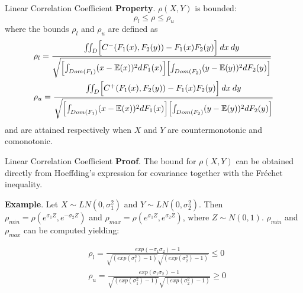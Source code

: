 \documentclass[11pt]{beamer}
\theoremstyle{plain}
\theoremstyle{definition}
\theoremstyle{remark}
\begin{document}
\begin{frame}{Linear Correlation Coefficient}
\noindent\textbf{Property}. $\rho(X,Y)$ is bounded:
$$
\rho_l \le \rho \le \rho_u
$$
where the bounds $\rho_l$ and $\rho_u$ are defined as
\footnotesize{
	\begin{equation}
	\begin{split}
	& \rho_l = \frac{\iint_D \Bigl[ C^-(F_1(x), F_2(y)) - F_1(x)F_2(y) \Bigr] \> dx\>dy}
	                        {\sqrt{
	                                  \Bigl[ \int_{Dom(F_1)}(x-\mathbb{E}(x))^2dF_1(x) \Bigr]
	                                  \Bigl[ \int_{Dom(F_2)}(y-\mathbb{E}(y))^2dF_2(y) \Bigr]
	                                 }
	                        } \\
	& \rho_u = \frac{\iint_D \Bigl[ C^+(F_1(x), F_2(y)) - F_1(x)F_2(y) \Bigr] \> dx\>dy}
	                        {\sqrt{
	                                  \Bigl[ \int_{Dom(F_1)}(x-\mathbb{E}(x))^2dF_1(x) \Bigr]
	                                  \Bigl[ \int_{Dom(F_2)}(y-\mathbb{E}(y))^2dF_2(y) \Bigr]
	                                 }
	                        } \\
	\end{split}
	\end{equation}
}
\normalsize
and are attained respectively when $X$ and $Y$ are countermonotonic and comonotonic.
\end{frame}
%
\begin{frame}{Linear Correlation Coefficient}
 \noindent\textbf{Proof}. The bound for $\rho(X,Y)$ can be obtained directly from Hoeffding's expression for covariance together with the Fréchet inequality. 
	
\bigskip	
\noindent\textbf{Example}. Let $X \sim LN(0, \sigma_1^2)$ and $Y \sim LN(0, \sigma_2^2)$. Then $\rho_{min} = \rho(e^{\sigma_1Z}, e^{-\sigma_2 Z})$ and $\rho_{max} = \rho(e^{\sigma_1Z}, e^{\sigma_2 Z})$, where $Z \sim N(0,1)$. $\rho_{min}$ and $\rho_{max}$ can be computed yielding:

\begin{equation}
\begin{split}
& \rho_l = \frac{exp(-\sigma_1 \sigma_2) - 1}
                        {
                         \sqrt{(exp(\sigma_1^2) - 1)}
                         \sqrt{(exp(\sigma_2^2) - 1)}
                        } \le 0 \\
& \rho_u = \frac{exp(\sigma_1 \sigma_2) - 1}
                        {
                         \sqrt{(exp(\sigma_1^2) - 1)}
                         \sqrt{(exp(\sigma_2^2) - 1)}
                        } \ge 0
\end{split}
\end{equation}
\end{frame}
\end{document}
